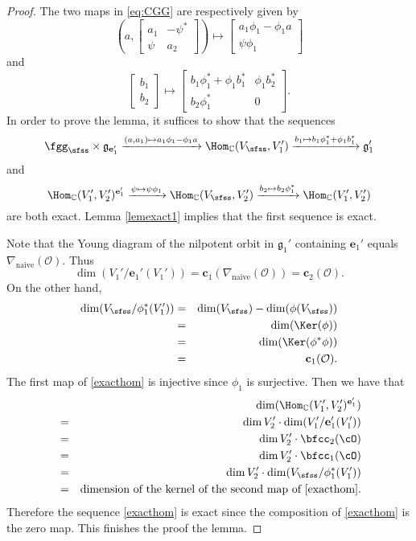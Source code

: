 \documentclass[12pt,a4paper]{amsart}
\newcommand{\CO}{{\mathcal {O}}}
\newcommand{\g}{\mathfrak g}
\newcommand{\be}{\begin {equation}}
\newcommand{\ee}{\end {equation}}
\numberwithin{equation}{section}
\theoremstyle{remark}
\begin{document}
\begin{proof}
The two maps in \eqref{eq:CGG} are respectively given by
\[
  \left(a, \begin{bmatrix}
        a_1 & -\psi^*\\
        \psi & a_2
      \end{bmatrix}\right)\mapsto   \begin{bmatrix}
        a_1 \phi_1-\phi_1 a\\
        \psi \phi_1
      \end{bmatrix}
\]
and
\[
  \begin{bmatrix}
       b_1\\
       b_2
      \end{bmatrix}\mapsto   \begin{bmatrix}
       b_1 \phi_1^*+\phi_1 b_1^*  & \phi_1 b_2^*\\
        b_2 \phi_1^* & 0
      \end{bmatrix}.
\]
In order to prove the lemma, it suffices to show that the sequences
 \[
  \fggs\times  \g_{\mathbf e_1'} \xrightarrow{(a,a_1)\mapsto  a_1 \phi_1-\phi_1 a } \Hom_\C(V_\sfss, V_1')
  \xrightarrow{b_1\mapsto  b_1\phi_1^{*}+\phi_1 b_1^{*} } \g_1'
  \]
and
\be\label{exacthom}
  \Hom_\C(V_1', V_2')^{\mathbf e_1'} \xrightarrow{\psi \mapsto  \psi \phi_1 } \Hom_\C(V_\sfss, V_2')
  \xrightarrow{b_2\mapsto  b_2\phi_1^{*}}  \Hom_\C(V_1', V_2')
\ee
are both exact. Lemma \ref{lemexact1} implies that the first sequence is exact.

Note that the Young diagram of the nilpotent orbit in $\g_1'$ containing $\mathbf e_1'$ equals $\nabla_{\mathrm{naive}}(\CO)$. Thus
\[
  \dim (V_1'/\mathbf e_1'(V_1'))=\mathbf c_1(\nabla_{\mathrm{naive}}(\CO))=\mathbf c_2(\CO).
\]
On the other hand,
\begin{eqnarray*}
  \dim (V_{\sfss}/\phi_1^*(V_1'))&=&\dim (V_{\sfss})-\dim (\phi(V_{\sfss}))\\
  &=&\dim(\Ker(\phi))\\
  &=&\dim(\Ker(\phi^*\phi))\\
  &=&\mathbf c_1(\CO).
\end{eqnarray*}
The first map of \eqref{exacthom} is injective since $\phi_1$ is surjective. Then we have that
\begin{eqnarray*}
     && \dim ( \Hom_\C(V_1', V_2')^{\mathbf e_1'} ) \\
      &=& \dim V_2' \cdot \dim (V_1'/\mathbf e_1'(V_1'))\\
      & = &\dim V_2' \cdot  \bfcc_{2}(\cO)\\
      & = &\dim V_2' \cdot  \bfcc_{1}(\cO)\\
        & = &\dim V_2' \cdot  \dim (V_{\sfss}/\phi_1^*(V_1'))\\
        &=& \textrm{dimension of the kernel of the second map of  \eqref{exacthom}}.
    \end{eqnarray*}
Therefore the sequence \eqref{exacthom} is exact since the composition of  \eqref{exacthom} is the zero map. This finishes the proof the lemma.

\end{proof}
\end{document}
